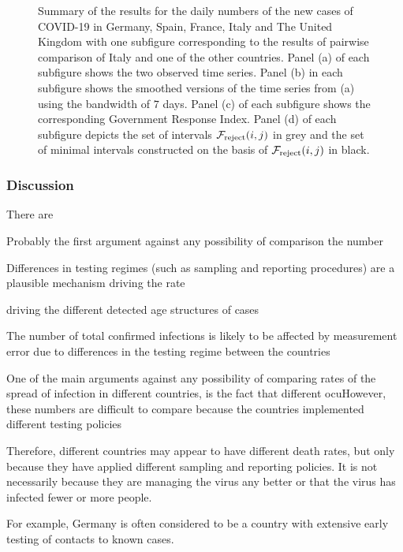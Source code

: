 \documentclass[a4paper,12pt]{article}
\numberwithin{equation}{section}
\begin{document}
\begin{figure}[t!]
\caption{Summary of the results for the daily numbers of the new cases of COVID-19 in Germany, Spain, France, Italy and The United Kingdom with one subfigure corresponding to the results of pairwise comparison of Italy and one of the other countries. Panel (a) of each subfigure shows the two observed time series. Panel (b) in each subfigure shows the smoothed versions of the time series from (a) using the bandwidth of $7$ days. Panel (c) of each subfigure shows the corresponding Government Response Index. %
Panel (d) of each subfigure depicts the set of intervals $\mathcal{F}_{\text{reject}}(i,j)$ in grey and the set of minimal intervals constructed on the basis of $\mathcal{F}_{\text{reject}}(i,j)$ in black.}\label{fig:covid19}
\end{figure}

\FloatBarrier
\subsubsection{Discussion}
There are 

Probably the first argument against any possibility of comparison the number 

Differences in testing regimes (such as sampling and reporting procedures) are a plausible mechanism driving the rate 

driving the different detected age structures of cases

The number of total confirmed infections is likely to be affected by measurement error due to differences in the testing regime between the countries


One of the main arguments against any possibility of comparing rates of the spread of infection in different countries, is the fact that different ocuHowever, these numbers are difficult to compare
because the countries implemented different testing policies



Therefore, different countries may appear to have different death rates, but only because they have applied different sampling and reporting policies. It is not necessarily because they are managing the virus any better or that the virus has infected fewer or more people.

For example, Germany is often considered to be a country with extensive early testing of contacts to known cases.
\end{document}
